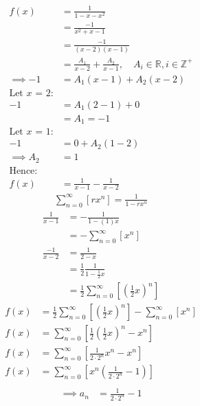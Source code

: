 \documentclass{article}
\begin{document}
\begin{align*}
    f\left( x \right)&= \frac{1}{1- x- x^2}\\
&= \frac{- 1}{x^2 +  x -  1}\\
&= \frac{- 1}{\left( x- 2 \right)\left( x- 1 \right)}\\
&= \frac{A_1}{x- 2}+  \frac{A_2}{x- 1}, \quad A_i \in \mathbb{R}, i \in \mathbb{Z}^+ \\
 \implies  - 1 &= A_1\left( x- 1 \right) +  A_2\left( x- 2 \right)\\
 \text{Let $x$ = 2:}\\
 - 1&= A_1\left( 2-1 \right) +  0 \\
&= A_1 = - 1 \\
 \text{Let $x$ = 1:}\\
 - 1 &=  0 +  A_2 \left( 1- 2 \right) \\
 \implies  A_2&= 1 \\
 \text{Hence:}\\
 f\left( x \right)&=    \frac{1}{x- 1} - \frac{1}{x- 2}
\end{align*}
\begin{align}
\sum^{\infty}_{n= 0}\left[ rx^n \right] = \frac{1}{1- rx^n} \label{eq:pow-series-definition}
\end{align}
\begin{align*}
\frac{1}{x- 1}&= -\frac{1}{1 -\left( 1 \right) x} \\
&= -\sum^{\infty}_{n= 0}\left[ x^n \right]  \\
\frac{-1}{x- 2} &= \frac{1}{2- x} \\
&= \frac{1}{2}\frac{1}{1-\frac{1}{2}x} \\
&= \frac{1}{2} \sum^{\infty}_{n= 0}\left[ \left( \frac{1}{2}x \right) ^n \right]
\end{align*}
\begin{align*}
f\left( x \right) &= \frac{1}{2}\sum^{\infty}_{n= 0}\left[ \left( \frac{1}{2}x \right) ^n \right] - \sum^{\infty}_{n= 0}\left[ x^n \right] \\
f\left( x \right) &= \sum^{\infty}_{n= 0}\left[ \frac{1}{2}\left( \frac{1}{2}x \right) ^n -x^n \right]  \\
f\left( x \right) &= \sum^{\infty}_{n= 0}\left[ \frac{1}{2 \cdot 2^n} x^n -x^n \right]  \\
f\left( x \right) &= \sum^{\infty}_{n= 0}\left[x^n {\left( {\frac{1}{2 \cdot 2^n} -1} \right) } \right]  \\
\end{align*}
\begin{align}
 \implies  a_n &= \frac{1}{2 \cdot 2^n} - 1 \label{eq:seq-end-value}
\end{align}
\end{document}
